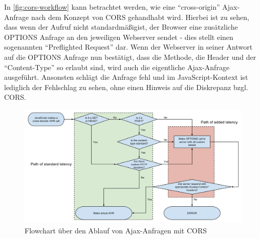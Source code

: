 In \autoref{fig:cors-workflow} kann betrachtet werden, wie eine \enquote{cross-origin} Ajax-Anfrage nach dem Konzept von CORS gehandhabt wird. Hierbei ist zu sehen, dass wenn der Aufruf nicht standardmäßig\footnotemark ist, der Browser eine zusätzliche OPTIONS Anfrage an den jeweiligen Webserver sendet - dies stellt einen sogenannten \enquote{Preflighted Request} dar. Wenn der Webserver in seiner Antwort auf die OPTIONS Anfrage nun bestätigt, dass die Methode, die Header und der \enquote{Content-Type} so erlaubt sind, wird auch die eigentliche Ajax-Anfrage ausgeführt. Ansonsten schlägt die Anfrage fehl und im JavaScript-Kontext ist lediglich der Fehlschlag zu sehen, ohne einen Hinweis auf die Diskrepanz bzgl. CORS.


\begin{figure}[H]
	\centering
	\includegraphics[width=\linewidth]{img/02_theorie/1280px-Flowchart_showing_Simple_and_Preflight_XHR.svg.png}
	\caption{Flowchart über den Ablauf von Ajax-Anfragen mit CORS \cite{FlowchartCORS}}
	\label{fig:cors-workflow}
\end{figure}

%
%

